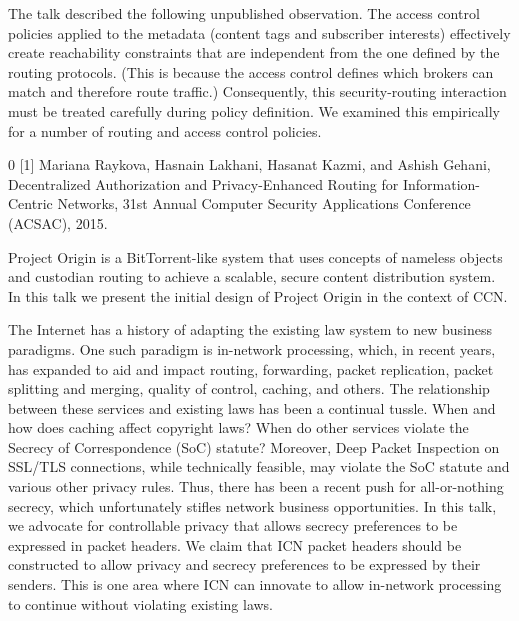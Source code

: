 \documentclass[a4paper,UKenglish]{dagrep}
\begin{document}
The talk described the following unpublished observation. The access control policies applied to the metadata (content tags and subscriber interests) effectively create reachability constraints that are independent from the one defined by the routing protocols. (This is because the access control defines which brokers can match and therefore route traffic.) Consequently, this security-routing interaction must be treated carefully during policy definition. We examined this empirically for a number of routing and access control policies.

\begin{thebibliography}{0}
[1] Mariana Raykova, Hasnain Lakhani, Hasanat Kazmi, and Ashish Gehani, Decentralized Authorization and Privacy-Enhanced Routing for Information-Centric Networks, 31st Annual Computer Security Applications Conference (ACSAC), 2015.
\end{thebibliography}

\license

Project Origin is a BitTorrent-like system that uses concepts of nameless objects and custodian routing to achieve a scalable, secure content distribution system. In this talk we present the initial design of Project Origin in the context of CCN.

\license

The Internet has a history of adapting the existing law system to new business paradigms.
One such paradigm is in-network processing, which, in recent years, has expanded to 
aid and impact routing, forwarding, packet replication, packet splitting and merging,
quality of control, caching, and others. The relationship between these services and 
existing laws has been a continual tussle. When and how does caching affect copyright laws?
When do other services violate the Secrecy of Correspondence (SoC) statute? 
Moreover, Deep Packet Inspection on SSL/TLS connections, while technically feasible, may violate 
the SoC statute and various other privacy rules. Thus, there has been a recent push for
all-or-nothing secrecy, which unfortunately stifles network business opportunities.
In this talk, we advocate for controllable privacy that allows secrecy preferences to be 
expressed in packet headers. We claim that ICN packet headers should be constructed to allow
privacy and secrecy preferences to be expressed by their senders. This is one area where ICN 
can innovate to allow in-network processing to continue without violating existing laws.
\end{document}
